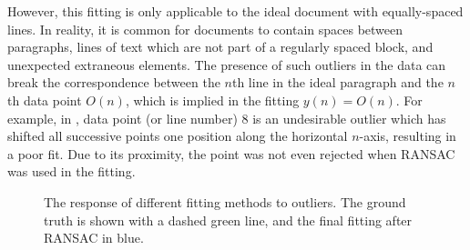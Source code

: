 {However, this fitting is only applicable to the ideal document with
equally-spaced lines. 
In reality, it is common for documents to contain
spaces between paragraphs,
lines of text which are not part of a regularly spaced block,
and unexpected extraneous elements.
The presence of such outliers in the data can break the correspondence between
the $n$th line in the ideal paragraph and the $n$th data point $O(n)$, which is implied in the fitting $y(n)=O(n)$.
For example, in , data point (or line number) 8 is an undesirable outlier
which has shifted all successive points one position along the horizontal $n$-axis,
resulting in a poor fit.
Due to its proximity, the point was not even rejected when RANSAC was used in
 the fitting.
\begin{figure}[t]
\centering
\begin{center}
	\caption{The response of different fitting methods to outliers.
		The ground truth is shown with a dashed green line, and the final fitting after RANSAC in blue.
	}
	\label{fittingexamples}
\end{center}
\end{figure}
}
